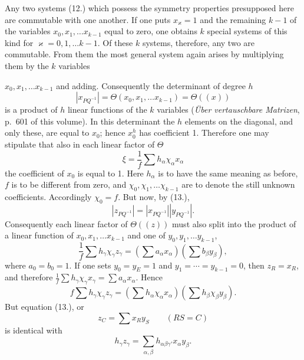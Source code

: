 \documentclass[11pt]{article}
\begin{document}
Any two systems (12.) which possess the symmetry properties presupposed here are commutable with one another. If one puts $x_\varkappa=1$ and the remaining $k-1$ of the variables $x_0,x_1,\ldots x_{k-1}$ equal to zero, one obtains $k$ special systems of this kind for $\varkappa=0,1,\ldots k-1$. Of these $k$ systems, therefore, any two are commutable. From them the most general system again arises by multiplying them by the $k$ variables


$x_0,x_1,\ldots x_{k-1}$ and adding. Consequently the determinant of degree $h$
\begin{equation*}\tag{14.}
\left|x_{PQ^{-1}}\right|=\Theta(x_0,x_1,\ldots x_{k-1})=\Theta((x))
\end{equation*}
is a product of $h$ linear functions of the $k$ variables (\emph{Über vertauschbare Matrizen}, p.~601 of this volume). In this determinant the $h$ elements on the diagonal, and only these, are equal to $x_0$; hence $x_0^h$ has coefficient 1. Therefore one may stipulate that also in each linear factor of $\Theta$
\begin{equation*}\tag{15.}
\xi=\frac{1}{f}\sum h_\alpha\chi_\alpha x_\alpha
\end{equation*}
the coefficient of $x_0$ is equal to 1. Here $h_\alpha$ is to have the same meaning as before, $f$ is to be different from zero, and $\chi_0,\chi_1,\ldots\chi_{k-1}$ are to denote the still unknown coefficients. Accordingly $\chi_0=f$. But now, by (13.),
\[
\left|z_{PQ^{-1}}\right|=\left|x_{PQ^{-1}}\right|\left|y_{PQ^{-1}}\right|.
\]
Consequently each linear factor of $\Theta((z))$ must also split into the product of a linear function of $x_0,x_1,\ldots x_{k-1}$ and one of $y_0,y_1,\ldots y_{k-1}$,
\[
\frac{1}{f}\sum h_\gamma\chi_\gamma z_\gamma=\left(\sum a_\alpha x_\alpha\right)\left(\sum b_\beta y_\beta\right),
\]
where $a_0=b_0=1$. If one sets $y_0=y_E=1$ and $y_1=\cdots=y_{k-1}=0$, then $z_R=x_R$, and therefore $\frac{1}{f}\sum h_\gamma\chi_\gamma x_\gamma=\sum a_\alpha x_\alpha$. Hence
\begin{equation*}\tag{16.}
f\sum h_\gamma\chi_\gamma z_\gamma=\left(\sum h_\alpha\chi_\alpha x_\alpha\right)\left(\sum h_\beta\chi_\beta y_\beta\right).
\end{equation*}
But equation (13.), or
\begin{equation*}\tag{17.}
z_C=\sum x_Ry_S\qquad(RS=C)
\end{equation*}
is identical with
\begin{equation*}\tag{18.}
h_\gamma z_\gamma=\sum_{\alpha,\beta}h_{\alpha\beta\gamma'}x_\alpha y_\beta.
\end{equation*}
\end{document}
